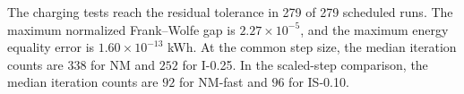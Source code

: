 The charging tests reach the residual tolerance in 279 of 279 scheduled runs.
The maximum normalized Frank--Wolfe gap is $2.27\times10^{-5}$, and the maximum energy equality error is $1.60\times10^{-13}$ kWh.
At the common step size, the median iteration counts are $338$ for NM and $252$ for I-0.25.
In the scaled-step comparison, the median iteration counts are $92$ for NM-fast and $96$ for IS-0.10.
